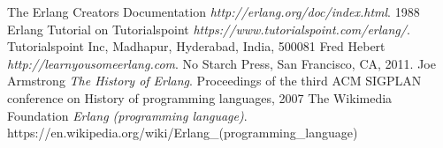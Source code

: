 \documentclass[11pt]{article}
\begin{document}
\begin{thebibliography}{9}
    The Erlang Creators Documentation
    \textit{http://erlang.org/doc/index.html}.
    1988
    Erlang Tutorial on Tutorialspoint
    \textit{https://www.tutorialspoint.com/erlang/}.
    Tutorialspoint Inc, Madhapur, Hyderabad, India, 500081
    Fred Hebert
    \textit{http://learnyousomeerlang.com}.
    No Starch Press, San Francisco, CA, 2011.
    Joe Armstrong
    \textit{The History of Erlang}.
    Proceedings of the third ACM SIGPLAN conference on History of programming languages, 2007
    The Wikimedia Foundation
    \textit{Erlang (programming language)}.
    https://en.wikipedia.org/wiki/Erlang\_(programming\_language)

\end{thebibliography}
\end{document}
